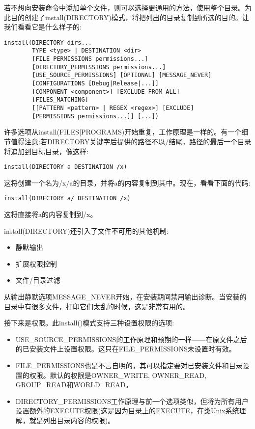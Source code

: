 若不想向安装命令中添加单个文件，则可以选择更通用的方法，使用整个目录。为此目的创建了install(DIRECTORY)模式，将把列出的目录复制到所选的目的。让我们看看它是什么样子的:

\begin{lstlisting}[style=styleCMake]
install(DIRECTORY dirs...
		TYPE <type> | DESTINATION <dir>
		[FILE_PERMISSIONS permissions...]
		[DIRECTORY_PERMISSIONS permissions...]
		[USE_SOURCE_PERMISSIONS] [OPTIONAL] [MESSAGE_NEVER]
		[CONFIGURATIONS [Debug|Release|...]]
		[COMPONENT <component>] [EXCLUDE_FROM_ALL]
		[FILES_MATCHING]
		[[PATTERN <pattern> | REGEX <regex>] [EXCLUDE]
		[PERMISSIONS permissions...]] [...])
\end{lstlisting}

许多选项从install(FILES|PROGRAMS)开始重复，工作原理是一样的。有一个细节值得注意:若DIRECTORY关键字后提供的路径不以/结尾，路径的最后一个目录将追加到目标目录，像这样:

\begin{lstlisting}[style=styleCMake]
install(DIRECTORY a DESTINATION /x)
\end{lstlisting}

这将创建一个名为/x/a的目录，并将a的内容复制到其中。现在，看看下面的代码:

\begin{lstlisting}[style=styleCMake]
install(DIRECTORY a/ DESTINATION /x)
\end{lstlisting}

这将直接将a的内容复制到/x。

install(DIRECTORY)还引入了文件不可用的其他机制:

\begin{itemize}
\item 
静默输出

\item 
扩展权限控制

\item 
文件/目录过滤
\end{itemize}

从输出静默选项MESSAGE\_NEVER开始，在安装期间禁用输出诊断。当安装的目录中有很多文件，打印它们太乱的时候，这是非常有用的。

接下来是权限。此install()模式支持三种设置权限的选项:

\begin{itemize}
\item 
USE\_SOURCE\_PERMISSIONS的工作原理和预期的一样——在原文件之后的已安装文件上设置权限。这只在FILE\_PERMISSIONS未设置时有效。

\item 
FILE\_PERMISSIONS也是不言自明的，其可以指定要对已安装文件和目录设置的权限。默认的权限是OWNER\_WRITE, OWNER\_READ, GROUP\_READ和WORLD\_READ。

\item 
DIRECTORY\_PERMISSIONS工作原理与前一个选项类似，但将为所有用户设置额外的EXECUTE权限(这是因为目录上的EXECUTE，在类Unix系统理解，就是列出目录内容的权限)。
\end{itemize}

